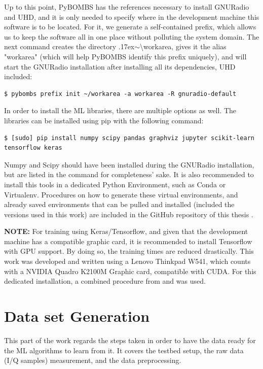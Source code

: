 Up to this point, \ac{PyBOMBS} has the references necessary to install GNURadio and \ac{UHD}, and it is only needed to specify where in the development machine this software is to be located. For it, we generate a self-contained prefix, which allows us to keep the software all in one place without polluting the system domain. The next command creates the directory {\raise.17ex\hbox{$\scriptstyle\sim$}}\textbackslash workarea, gives it the alias "workarea" (which will help \ac{PyBOMBS} identify this prefix uniquely), and will start the GNURadio installation after installing all its dependencies, \ac{UHD} included:

\begin{lstlisting}[breaklines=true]
    $ pybombs prefix init ~/workarea -a workarea -R gnuradio-default
\end{lstlisting}


In order to install the \ac{ML} libraries, there are multiple options as well. The libraries can be installed using pip with the following command:

\begin{lstlisting}[breaklines=true]
    $ [sudo] pip install numpy scipy pandas graphviz jupyter scikit-learn tensorflow keras
\end{lstlisting}

Numpy and Scipy should have been installed during the GNURadio installation, but are listed in the command for completeness' sake. It is also recommended to install this tools in a dedicated Python Environment, such as Conda or Virtualenv. Procedures on how to generate these virtual environments, and already saved environments that can be pulled and installed (included the versions used in this work) are included in the GitHub repository of this thesis \cite{repo:cognitive_radio_ml}.

\textbf{NOTE:} For training using Keras/Tensorflow, and given that the development machine has a compatible graphic card, it is recommended to install Tensorflow with GPU support. By doing so, the training times are reduced drastically. This work was developed and written using a Lenovo Thinkpad W541, which counts with a NVIDIA Quadro K2100M Graphic card, compatible with CUDA. For this dedicated installation, a combined procedure from \cite{Yadak} and \cite{Andrews} was used.

\section{Data set Generation}
This part of the work regards the steps taken in order to have the data ready for the \ac{ML} algorithms to learn from it. It covers the testbed setup, the raw data (I/Q samples) measurement, and the data preprocessing.
